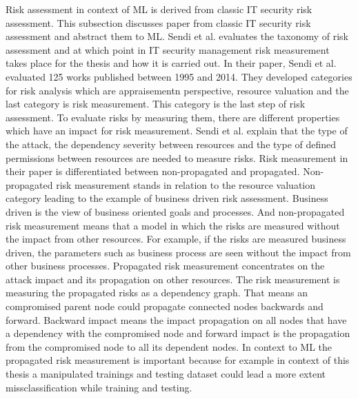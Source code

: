 Risk assessment in context of ML is derived from classic IT security risk assessment. This subsection discusses paper from classic IT security risk assessment and abstract them to ML.
Sendi et al. \cite{DBLP:journals/compsec/SendiAC16} evaluates the taxonomy of risk assessment and at which point in IT security management risk measurement takes place for the thesis and
how it is carried out. In their paper, Sendi et al. evaluated 125 works published between 1995 and 2014. They developed categories for risk analysis which are appraisementn perspective,
resource valuation and the last category is risk measurement. This category is the last step of risk assessment. To evaluate risks by measuring them, there are different properties which
have an impact for risk measurement. Sendi et al. explain that the type of the attack, the dependency severity between resources and the type of defined permissions between resources are
needed to measure risks. Risk measurement in their paper is differentiated between non-propagated and propagated. Non-propagated risk measurement stands in relation to the resource
valuation category leading to the example of business driven risk assessment. Business driven is the view of business oriented goals and processes. And non-propagated risk measurement
means that a model in which the risks are measured without the impact from other resources. For example, if the risks are measured business driven, the parameters such as business process
are seen without the impact from other business processes. Propagated risk measurement concentrates on the attack impact and its propagation on other resources. The risk measurement is
measuring the propagated risks as a dependency graph. That means an compromised parent node could propagate connected nodes backwards and forward. Backward impact means the impact
propagation on all nodes that have a dependency with the compromised node and forward impact is the propagation from the compromised node to all its dependent nodes. In context to ML the
propagated risk measurement is important because for example in context of this thesis a manipulated trainings and testing dataset could lead a more extent missclassification while
training and testing.
